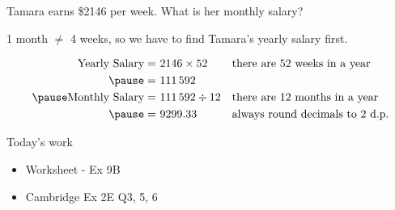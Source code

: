 \documentclass[aspectratio=169,10pt]{beamer}
\begin{document}
\begin{frame}
  \begin{example}
    Tamara earns \$2146 per week. What is her monthly salary?
  \end{example}\pause
  \vspace{-7pt}
  \begin{important}
    1 month $\neq$ 4 weeks, so we have to find Tamara's yearly salary first.
  \end{important}\pause
  \begin{solution}
    \[\begin{aligned}
      \text{Yearly Salary}=&\ 2146\times 52 && \text{there are 52 weeks in a year}\\\pause
      =&\ 111\,592\\\pause
      \text{Monthly Salary}=&\ 111\,592\div 12 && \text{there are 12 months in a year}\\\pause
      =&\ 9299.33 && \text{always round decimals to 2 d.p.}
    \end{aligned}\]
  \end{solution}
\end{frame}

\begin{frame}{Today's work}
  \begin{itemize}
    \item Worksheet - Ex 9B
    \item Cambridge Ex 2E Q3, 5, 6
  \end{itemize}
\end{frame}
\end{document}
